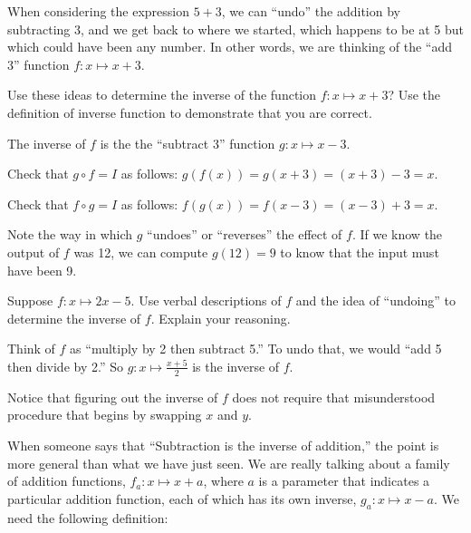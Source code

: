 \documentclass{ximera}
\begin{document}
When considering the expression $5+3$, we can ``undo'' the addition by subtracting 3, and we get back to where we started, which happens to be at 5 but which could have been any number.  In other words, we are thinking of the ``add 3'' function $f:x\mapsto x+3$.  
\begin{question}
Use these ideas to determine the inverse of the function $f:x\mapsto x+3$?  Use the definition of inverse function to demonstrate that you are correct.  
\begin{freeResponse}
\begin{hint}
The inverse of $f$ is the the ``subtract 3'' function $g:x\mapsto x-3$.  

Check that $g\circ f=I$ as follows:  $g(f(x))=g(x+3)=(x+3)-3=x$.  

Check that $f\circ g = I$ as follows:  $f(g(x))=f(x-3)=(x-3)+3=x$.  

\end{hint}
\end{freeResponse}
\end{question}

Note the way in which $g$ ``undoes'' or ``reverses'' the effect of $f$.  If we know the output of $f$ was 12, we can compute $g(12)=9$ to know that the input must have been 9.  

\begin{question}
Suppose $f:x\mapsto 2x-5$.  Use verbal descriptions of $f$ and the idea of ``undoing'' to determine the inverse of $f$.  Explain your reasoning.  
\begin{freeResponse}
\begin{hint}
Think of $f$ as ``multiply by 2 then subtract 5.'' To undo that, we would ``add 5 then divide by 2.''  So $g:x\mapsto \frac{x+5}{2}$ is the inverse of $f$.  
\end{hint}
\end{freeResponse}
\end{question}

\begin{remark}
Notice that figuring out the inverse of $f$ does not require that misunderstood procedure that begins by swapping $x$ and $y$.  
\end{remark}

When someone says that ``Subtraction is the inverse of addition,'' the point is more general than what we have just seen.  We are really talking about a family of addition functions, $f_a:x\mapsto x+a$, where $a$ is a parameter that indicates a particular addition function, each of which has its own inverse, $g_a:x\mapsto x-a$.  We need the following definition:  
\end{document}
